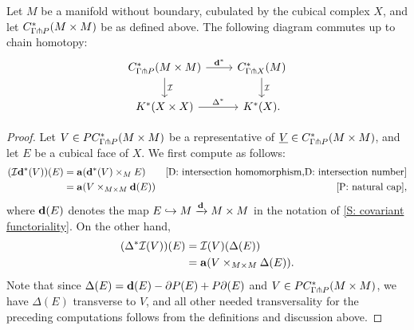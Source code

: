 \begin{proposition}\label{P: diag/intersect}
	Let $M$ be a manifold without boundary, cubulated by the cubical complex $X$, and let $C^*_{\Gamma \pitchfork P}(M \times M)$ be as defined above.
	The following diagram commutes up to chain homotopy:
	\[
	\begin{tikzcd}
	C^*_{\Gamma \pf P}(M \times M) \arrow[r,"\diag^*"] \arrow[d,"\mc I"]& C^*_{\Gamma \pf X}(M) \arrow[d,"\mc I"]  \\
	 \arrow[r,"\Delta^*"] K^*(X\times X)&K^*(X).
	\end{tikzcd}
	\]
\end{proposition}
\begin{proof}
	Let $V \in PC^*_{\Gamma \pitchfork P}(M \times M)$ be a representative of $\underline{V} \in C^*_{\Gamma \pitchfork P}(M \times M)$, and let $E$ be a cubical face of $X$.
	We first compute as follows:
	\begin{align*}
		(\mc I \diag^*(V))(E) & = \aug(\diag^*(V) \times_M  E) &\text{\cref{D: intersection homomorphism,D: intersection number}}\\
		&=\aug(V \times_{M \times M} \diag(E)) &\text{\cref{P: natural cap}},
	\end{align*}
	where $\mathbf{d}(E)$ denotes the map $E \hookrightarrow M \xrightarrow{\mathbf{d}} M \times M$ in the notation of \cref{S: covariant functoriality}.
	On the other hand,
		\begin{align*}
		(\Delta^*\mathcal{I}(V))(E) & = \mathcal{I}(V)(\Delta (E))\\
		&=\mathbf{a}(V \times_{M \times M} \Delta (E)).
	\end{align*}
	Note that since $\Delta (E) = \mathbf{d}(E) - \partial P(E) + P \partial(E)$ and $V \in PC^*_{\Gamma \pitchfork P}(M \times M)$, we have $\Delta(E)$ transverse to $V$, and all other needed transversality for the preceding computations follows from the definitions and discussion above.


\end{proof}
